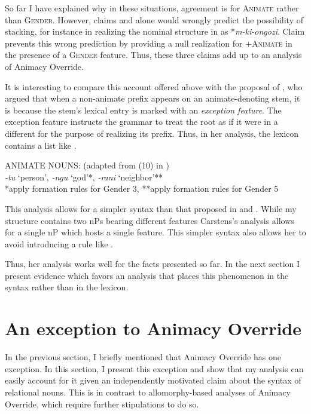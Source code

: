 \documentclass[output=paper
,newtxmath
,modfonts
,nonflat]{langsci/langscibook}
\begin{document}
So far I have explained why in these situations, agreement is for \textsc{Animate} rather than \textsc{Gender}.  However, claims  and  alone would wrongly predict the possibility of  stacking, for instance in realizing the nominal structure in   as  *\textit{m-ki-ongozi}.  Claim  prevents this wrong prediction by providing a null realization for +\textsc{Animate} in the presence of a \textsc{Gender} feature. Thus, these three claims add up to an analysis of Animacy Override. 
 
 It is interesting to compare this account offered above with the proposal of \citet{carstens91}, who argued that when a non-animate prefix appears on an animate-denoting stem, it is because the stem's lexical entry is marked with an \textit{exception feature}.  The exception feature instructs the grammar to treat the root as if it were in a different  for the purpose of realizing its  prefix. Thus, in her analysis, the lexicon contains a list like .
 
 \ea\label{ex:pesetsky:carstinianlist} ANIMATE NOUNS: \hfill (adapted from (10) in \citet{carstens91}) \\ \textit{-tu} `person', \textit{-ngu}  `god'*,   \textit{-rani}   `neighbor'** \\ *apply formation rules for Gender 3, **apply formation rules for Gender 5 \\  \z 

This analysis allows for a simpler syntax than that proposed in  and .  While my structure contains two nPs bearing different  features Carstens's analysis allows for a single nP which hosts a single  feature.  This simpler syntax also allows her to avoid introducing a rule like .  

Thus, her analysis works well for the facts presented so far. In the next section I present evidence which favors an analysis that places this phenomenon in the syntax rather than in the lexicon.

\section{An exception to Animacy Override} \label{sec:pesetsky:exceptiontoAO}

 
In the previous section, I briefly mentioned that Animacy Override has one exception.  In this section, I present this exception and show that my analysis can easily account for it given an independently motivated claim about the syntax of  relational nouns. This is in contrast to allomorphy-based analyses of Animacy Override, which require further stipulations to do so.
 
\end{document}
